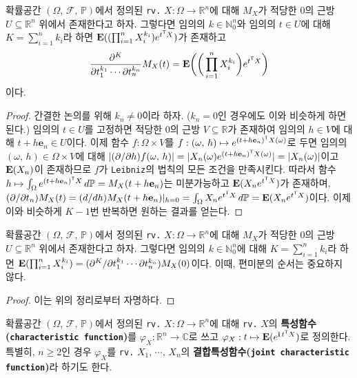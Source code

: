 \begin{theorem}\label{thm:MGFDifferentiation}
    확률공간 $(\Omega,\,\mathcal{F},\,\mathbb{P})$에서 정의된 \texttt{rv.} $X:\Omega\to\mathbb{R}^n$에 대해 $M_X$가 적당한 $0$의 근방 $U\subseteq\mathbb{R}^n$ 위에서 존재한다고 하자. 그렇다면 임의의 $k\in\mathbb{N}_0^n$와 임의의 $t\in U$에 대해 $K=\sum_{i=1}^nk_i$라 하면 $\mathbf{E}((\prod_{i=1}^nX_i^{k_i})e^{t^{\mathsf{T}} X})$가 존재하고
    \begin{equation*}
        \frac{\partial^K}{\partial t_1^{k_1}\cdots\partial t_n^{k_n}}M_X(t)=\mathbf{E}\bigg(\bigg(\prod_{i=1}^nX_i^{k_i}\bigg)e^{t^{\mathsf{T}} X}\bigg)
    \end{equation*}
    이다.
\end{theorem}

\begin{proof}
    간결한 논의를 위해 $k_n\ne0$이라 하자. ($k_n=0$인 경우에도 이와 비슷하게 하면 된다.) 임의의 $t\in U$를 고정하면 적당한 $0$의 근방 $V\subseteq\mathbb{R}$가 존재하여 임의의 $h\in V$에 대해 $t+h\mathbf{e}_n\in U$이다. 이제 함수 $f:\Omega\times V$를 $f:(\omega,\,h)\mapsto e^{(t+h\mathbf{e}_n)^{\mathsf{T}} X(\omega)}$로 두면 임의의 $(\omega,\,h)\in\Omega\times V$에 대해 $|(\partial/\partial h)f(\omega,\,h)|=|X_n(\omega)e^{(t+h\mathbf{e}_n)^{\mathsf{T}} X(\omega)}|=|X_n(\omega)|$이고 $\mathbf{E}(X_n)$이 존재하므로 $f$가 \texttt{Leibniz}의 법칙의 모든 조건을 만족시킨다. 따라서 함수 $h\mapsto\int_\Omega e^{(t+h\mathbf{e}_n)^{\mathsf{T}} X}\,d\mathbb{P}=M_X(t+h\mathbf{e}_n)$는 미분가능하고 $\mathbf{E}(X_ne^{t^{\mathsf{T}} X})$가 존재하며, $(\partial/\partial t_n)M_X(t)=(d/dh)M_X(t+h\mathbf{e}_n)\vert_{h=0}=\int_\Omega X_ne^{t^{\mathsf{T}} X}\,d\mathbb{P}=\mathbf{E}(X_ne^{t^{\mathsf{T}} X})$이다. 이제 이와 비슷하게 $K-1$번 반복하면 원하는 결과를 얻는다.
\end{proof}

\begin{corollary}
    확률공간 $(\Omega,\,\mathcal{F},\,\mathbb{P})$에서 정의된 \texttt{rv.} $X:\Omega\to\mathbb{R}^n$에 대해 $M_X$가 적당한 $0$의 근방 $U\subseteq\mathbb{R}^n$ 위에서 존재한다고 하자. 그렇다면 임의의 $k\in\mathbb{N}_0^n$에 대해 $K=\sum_{i=1}^nk_i$라 하면 $\mathbf{E}(\prod_{i=1}^nX_i^{k_i})=(\partial^K/\partial t_1^{k_1}\cdots\partial t_n^{k_n})M_X(0)$이다. 이때, 편미분의 순서는 중요하지 않다.
\end{corollary}

\begin{proof}
    이는 위의 정리로부터 자명하다.
\end{proof}

\begin{definition}
    확률공간 $(\Omega,\,\mathcal{F},\,\mathbb{P})$에서 정의된 \texttt{rv.} $X:\Omega\to\mathbb{R}^n$에 대해 \texttt{rv.} $X$의 \textbf{특성함수(\texttt{characteristic function})}를 $\varphi_X:\mathbb{R}^n\to\mathbb{C}$로 쓰고 $\varphi_X:t\mapsto\mathbf{E}(e^{\mathbf{i}\,t^{\mathsf{T}} X})$로 정의한다. 특별히, $n\geq2$인 경우 $\varphi_X$를 \texttt{rv.} $X_1,\,\cdots,\,X_n$의 \textbf{결합특성함수(\texttt{joint characteristic function})}라 하기도 한다.
\end{definition}

